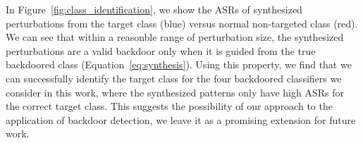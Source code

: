 \documentclass[10pt,twocolumn,letterpaper]{article}
\newcommand{\tablestyle}[2]{\setlength{\tabcolsep}{#1}\renewcommand{\arraystretch}{#2}\centering\footnotesize}
\begin{document}
\begin{table}[t!]
\centering 
\renewcommand{\arraystretch}{1.1}
\addtolength{\tabcolsep}{-0.5pt}
\caption{Quantitative results of \textit{Single Image Backdoor Inversion} on four backdoored classifiers. We report the average ASR of the reversed backdoor on the original backdoored classifier.}
\label{table:exp_asr}
\end{table}




In Figure~\ref{fig:class_identification}, we show the ASRs of synthesized perturbations from the target class (blue) versus normal non-targeted class (red). We can see that within a reasonble range of perturbation size, the synthesized perturbations are a valid backdoor only when it is guided from the true backdoored class (Equation~\ref{eq:synthesis}). Using this property, we find that we can successfully identify the target class for the four backdoored classifiers we consider in this work, where the synthesized patterns only have high ASRs for the correct target class. This suggests the possibility of our approach to the application of backdoor detection, we leave it as a promising extension for future work.
\end{document}

